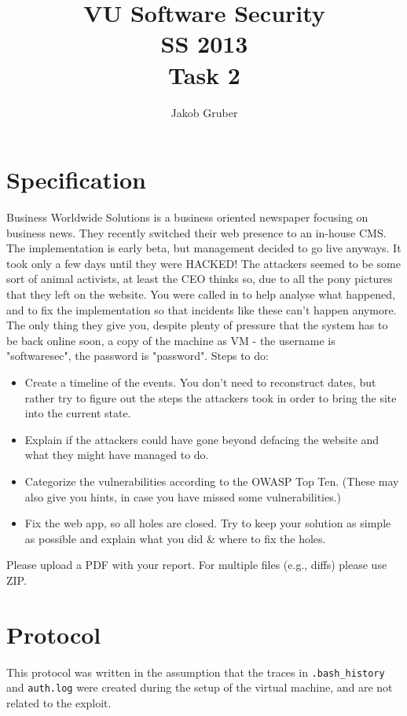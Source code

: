 \documentclass[a4paper,10pt]{article}
\title{VU Software Security \\
       SS 2013 \\
       Task 2}
\author{Jakob Gruber}
\begin{document}
\maketitle

\section{Specification}

Business Worldwide Solutions is a business oriented newspaper focusing on
business news. They recently switched their web presence to an in-house CMS.
The implementation is early beta, but management decided to go live anyways. It
took only a few days until they were HACKED! The attackers seemed to be some
sort of animal activists, at least the CEO thinks so, due to all the pony
pictures that they left on the website. You were called in to help analyse what
happened, and to fix the implementation so that incidents like these can't
happen anymore. The only thing they give you, despite plenty of pressure that
the system has to be back online soon, a copy of the machine as VM - the
username is "softwaresec", the password is "password". Steps to do:

\begin{itemize}
\item Create a timeline of the events. You don't need to reconstruct dates, but
  rather try to figure out the steps the attackers took in order to bring the
  site into the current state. 
\item Explain if the attackers could have gone beyond defacing the website and what
  they might have managed to do. 
\item Categorize the vulnerabilities according to the OWASP Top Ten. (These may
  also give you hints, in case you have missed some vulnerabilities.) 
\item Fix the web app, so all holes are closed. Try to keep your solution as simple
  as possible and explain what you did \& where to fix the holes.
\end{itemize}

Please upload a PDF with your report. For multiple files (e.g., diffs) please
use ZIP. 

\section{Protocol}

This protocol was written in the assumption that the traces in \verb|.bash_history|
and \verb|auth.log| were created during the setup of the virtual machine, and are
not related to the exploit.
\end{document}
